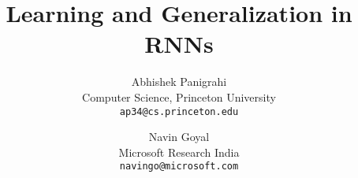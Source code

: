 \documentclass{article}
\title{Learning and Generalization in RNNs}
\author{%
	Abhishek Panigrahi\\
	Computer Science, Princeton University\\
	\texttt{ap34@cs.princeton.edu} \\
	\and
	Navin Goyal\\
	Microsoft Research India\\
	\texttt{navingo@microsoft.com}  
}
\theoremstyle{definition}
\theoremstyle{remark}
\theoremstyle{plain}
\theoremstyle{plain}
\theoremstyle{plain}
\theoremstyle{plain}
\begin{document}
\maketitle







\vskip 0.3in







\begin{abstract}

\end{abstract}


\end{document}
